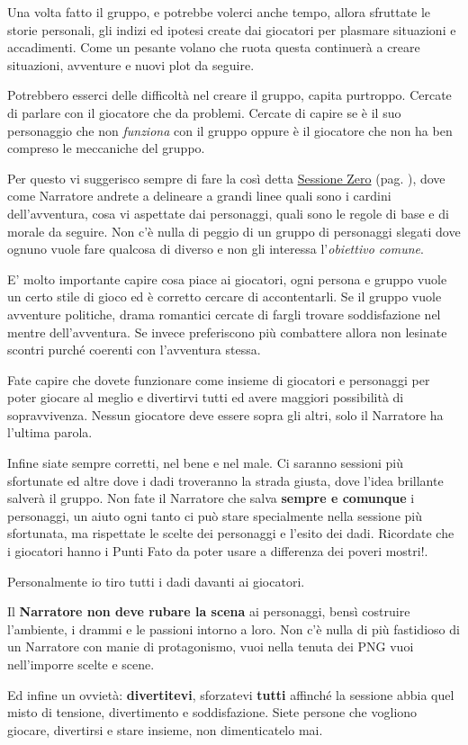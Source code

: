 {\begin{multicols}{2}
Una volta fatto il gruppo, e potrebbe volerci anche tempo, allora sfruttate le storie personali, gli indizi ed ipotesi create dai giocatori per plasmare situazioni e accadimenti. Come un pesante volano che ruota questa continuerà a creare situazioni, avventure e nuovi plot da seguire.

Potrebbero esserci delle difficoltà nel creare il gruppo, capita purtroppo. Cercate di parlare con il giocatore che da problemi. Cercate di capire se è il suo personaggio che non \emph{funziona} con il gruppo oppure è il giocatore che non ha ben compreso le meccaniche del gruppo.

Per questo vi suggerisco sempre di fare la così detta \hyperlink{sessionezero}{Sessione Zero} (pag. \pageref{sessionezero}), dove come Narratore andrete a delineare a grandi linee quali sono i cardini dell'avventura, cosa vi aspettate dai personaggi, quali sono le regole di base e di morale da seguire. Non c'è nulla di peggio di un gruppo di personaggi slegati dove ognuno vuole fare qualcosa di diverso e non gli interessa l'\emph{obiettivo comune}.

E' molto importante capire cosa piace ai giocatori, ogni persona e gruppo vuole un certo stile di gioco ed è corretto cercare di accontentarli. Se il gruppo vuole avventure politiche, drama romantici cercate di fargli trovare soddisfazione nel mentre dell'avventura. Se invece preferiscono più combattere allora non lesinate scontri purché coerenti con l'avventura stessa.

Fate capire che dovete funzionare come insieme di giocatori e personaggi per poter giocare al meglio e divertirvi tutti ed avere maggiori possibilità di sopravvivenza. Nessun giocatore deve essere sopra gli altri, solo il Narratore ha l'ultima parola.

Infine siate sempre corretti, nel bene e nel male. Ci saranno sessioni più sfortunate ed altre dove i dadi troveranno la strada giusta, dove l'idea brillante salverà il gruppo. Non fate il Narratore che salva \textbf{sempre e comunque} i personaggi, un aiuto ogni tanto ci può stare specialmente nella sessione più sfortunata, ma rispettate le scelte dei personaggi e l'esito dei dadi. Ricordate che i giocatori hanno i Punti Fato da poter usare a differenza dei poveri mostri!.

Personalmente io tiro tutti i dadi davanti ai giocatori.

Il \textbf{Narratore non deve rubare la scena} ai personaggi, bensì costruire l'ambiente, i drammi e le passioni intorno a loro. Non c'è nulla di più fastidioso di un Narratore con manie di protagonismo, vuoi nella tenuta dei PNG vuoi nell'imporre scelte e scene.

Ed infine un ovvietà: \textbf{divertitevi}, sforzatevi \textbf{tutti} affinché la sessione abbia quel misto di tensione, divertimento e soddisfazione. Siete persone che vogliono giocare, divertirsi e stare insieme, non dimenticatelo mai.
\end{multicols}}

